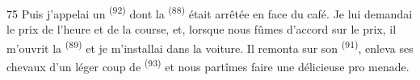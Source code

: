 \begin{VUpage}[77]{75}
\VUblancAlinea
Puis j'appelai un  \textsuperscript{(92)} dont la  \textsuperscript{(88)}\nl
était arrêtée en face du café. Je lui demandai le prix\nl
de l'heure et de la course, et, lorsque nous fûmes\nl
d'accord sur le prix, il m'ouvrit la  \textsuperscript{(89)} et je\nl
m'installai dans la voiture. Il remonta sur son\nl
{} \textsuperscript{(91)}, enleva ses chevaux d'un léger coup de\nl
{} \textsuperscript{(93)} et nous partîmes faire une délicieuse pro\cc
menade.

\VUsaut{6.0mm}
\VUfilet{22mm}
\end{VUpage}
